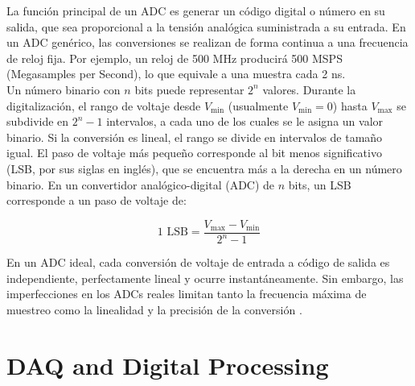 \documentclass[]{book}
\begin{document}
\noindent La función principal de un ADC es generar un código digital o número en su salida, que sea proporcional a la tensión analógica suministrada a su entrada. En un ADC genérico, las conversiones se realizan de forma continua a una frecuencia de reloj fija. Por ejemplo, un reloj de 500 MHz producirá 500 MSPS (Megasamples per Second), lo que equivale a una muestra cada 2 ns. \\

\noindent Un número binario con $n$ bits puede representar $2^{n}$ valores. Durante la digitalización, el rango de voltaje desde $V_{\text{min}}$ (usualmente $V_{\text{min}} = 0$) hasta $V_{\text{max}}$ se subdivide en $2^{n} - 1$ intervalos, a cada uno de los cuales se le asigna un valor binario. Si la conversión es lineal, el rango se divide en intervalos de tamaño igual. El paso de voltaje más pequeño corresponde al bit menos significativo (LSB, por sus siglas en inglés), que se encuentra más a la derecha en un número binario. En un convertidor analógico-digital (ADC) de $n$ bits, un LSB corresponde a un paso de voltaje de:

$$
1 \text{ LSB} = \frac{V_{\text{max}} - V_{\text{min}}}{2^n - 1}
$$

\noindent En un ADC ideal, cada conversión de voltaje de entrada a código de salida es independiente, perfectamente lineal y ocurre instantáneamente. Sin embargo, las imperfecciones en los ADCs reales limitan tanto la frecuencia máxima de muestreo como la linealidad y la precisión de la conversión \cite{kolanoski2020particle}. 


\section{DAQ and Digital Processing}
\end{document}
